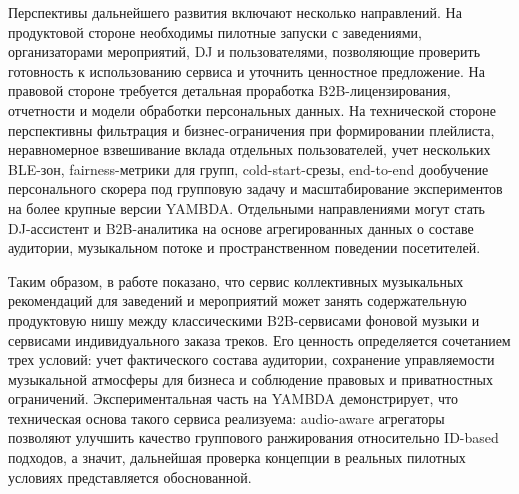 Перспективы дальнейшего развития включают несколько направлений. На продуктовой стороне необходимы пилотные запуски с заведениями, организаторами мероприятий, DJ и пользователями, позволяющие проверить готовность к использованию сервиса и уточнить ценностное предложение. На правовой стороне требуется детальная проработка B2B-лицензирования, отчетности и модели обработки персональных данных. На технической стороне перспективны фильтрация и бизнес-ограничения при формировании плейлиста, неравномерное взвешивание вклада отдельных пользователей, учет нескольких BLE-зон, fairness-метрики для групп, cold-start-срезы, end-to-end дообучение персонального скорера под групповую задачу и масштабирование экспериментов на более крупные версии YAMBDA. Отдельными направлениями могут стать DJ-ассистент и B2B-аналитика на основе агрегированных данных о составе аудитории, музыкальном потоке и пространственном поведении посетителей.

Таким образом, в работе показано, что сервис коллективных музыкальных рекомендаций для заведений и мероприятий может занять содержательную продуктовую нишу между классическими B2B-сервисами фоновой музыки и сервисами индивидуального заказа треков. Его ценность определяется сочетанием трех условий: учет фактического состава аудитории, сохранение управляемости музыкальной атмосферы для бизнеса и соблюдение правовых и приватностных ограничений. Экспериментальная часть на YAMBDA демонстрирует, что техническая основа такого сервиса реализуема: audio-aware агрегаторы позволяют улучшить качество группового ранжирования относительно ID-based подходов, а значит, дальнейшая проверка концепции в реальных пилотных условиях представляется обоснованной.
